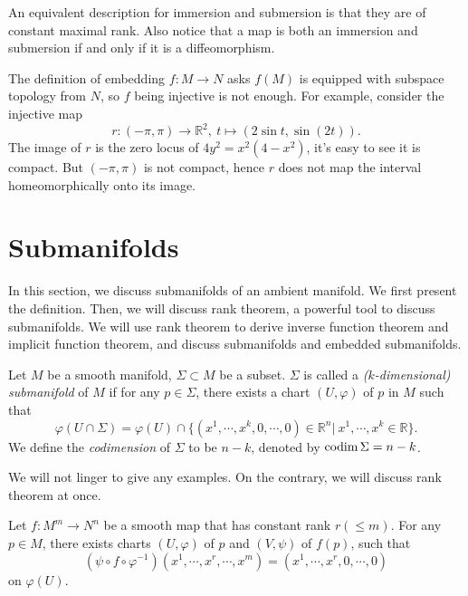 \begin{rem}
    An equivalent description for immersion and submersion is that they are of constant maximal rank.
    Also notice that a map is both an immersion and submersion if and only if it is a diffeomorphism.
\end{rem}

\begin{eg}
    The definition of embedding $f:M\to N$ asks $f(M)$ is equipped with subspace topology from $N$, so $f$ being injective is not enough.
    For example, consider the injective map
    \[r:(-\pi,\pi)\to\mathbb{R}^2,\ t\mapsto(2\sin{t},\sin(2t)).\]
    The image of $r$ is the zero locus of $4y^2=x^2(4-x^2)$, it's easy to see it is compact.
    But $(-\pi,\pi)$ is not compact, hence $r$ does not map the interval homeomorphically onto its image.
\end{eg}

\section{Submanifolds}

In this section, we discuss submanifolds of an ambient manifold.
We first present the definition.
Then, we will discuss rank theorem, a powerful tool to discuss submanifolds.
We will use rank theorem to derive inverse function theorem and implicit function theorem, and discuss submanifolds and embedded submanifolds.

\begin{defn}
    Let $M$ be a smooth manifold, $\Sigma\subset M$ be a subset.
    $\Sigma$ is called a \emph{($k$-dimensional) submanifold} of $M$ if for any $p\in\Sigma$, there exists a chart $(U,\varphi)$ of $p$ in $M$ such that 
    \[\varphi(U\cap\Sigma)=\varphi(U)\cap\{(x^1,\cdots,x^k,0,\cdots,0)\in\mathbb{R}^n|\ x^1,\cdots,x^k\in\mathbb{R}\}.\]
    We define the \emph{codimension} of $\Sigma$ to be $n-k$, denoted by $\operatorname{codim}\Sigma=n-k$.
\end{defn}

We will not linger to give any examples.
On the contrary, we will discuss rank theorem at once.

\begin{thm}
    Let $f:M^m\to N^n$ be a smooth map that has constant rank $r(\leq m)$.
    For any $p\in M$, there exists charts $(U,\varphi)$ of $p$ and $(V,\psi)$ of $f(p)$, such that
    \[(\psi\circ f\circ\varphi^{-1})(x^1,\cdots,x^r,\cdots,x^m)=(x^1,\cdots,x^r,0,\cdots,0)\]
    on $\varphi(U)$.
\end{thm}

